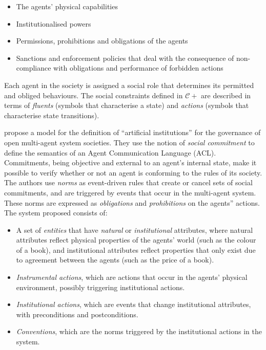 \documentclass[11pt]{report}
\begin{document}
\begin{itemize}
  \item The agents' physical capabilities
  \item Institutionalised powers
  \item Permissions, prohibitions and obligations of the agents
  \item Sanctions and enforcement policies that deal with the consequence of
    non-compliance with obligations and performance of forbidden actions
\end{itemize}

Each agent in the society is assigned a social role that determines its
permitted and obliged behaviours. The social constraints defined in $\mathcal{C}+$
are described in terms of \emph{fluents} (symbols that characterise a state) and
\emph{actions} (symbols that characterise state transitions).

\citet{fornara2007agent} propose a model for the definition
of ``artificial institutions'' for the governance of open multi-agent system societies. They use the notion of \emph{social
  commitment} to define the semantics of an Agent Communication Language (ACL).
Commitments, being objective and external to an agent's internal state,
make it possible to verify whether or not an agent is conforming to the rules of its
society. The authors use \emph{norms} as event-driven rules that create or
cancel sets of social commitments, and are triggered by events that occur in the
multi-agent system. These norms are expressed as \emph{obligations} and
\emph{prohibitions} on the agents'' actions. The system proposed consists of:

\begin{itemize}
\item A set of \emph{entities} that have \emph{natural} or \emph{institutional}
  attributes, where natural attributes reflect physical properties of the
  agents' world (such as the colour of a book), and institutional attributes
  reflect properties that only exist due to agreement between the agents (such
  as the price of a book).
\item \emph{Instrumental actions}, which are actions that occur in the agents'
  physical environment, possibly triggering institutional actions.
\item \emph{Institutional actions}, which are events that change institutional
  attributes, with preconditions and postconditions.
\item \emph{Conventions}, which are the norms triggered by the institutional
  actions in the system.
\end{itemize}
\end{document}
